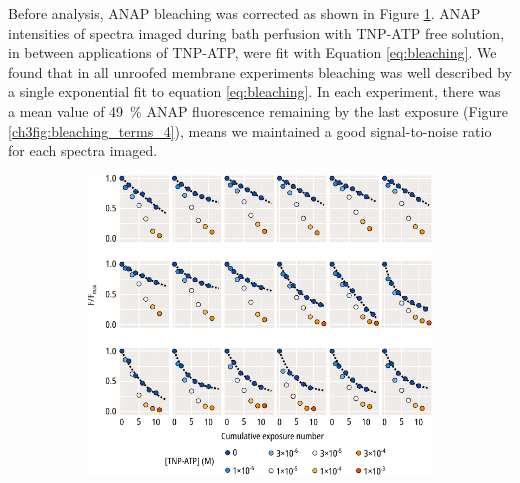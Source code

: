 Before analysis, ANAP bleaching was corrected as shown in Figure \ref{ch3fig:bleaching_plots_2}.
ANAP intensities of spectra imaged during bath perfusion with TNP-ATP free solution, in between applications of TNP-ATP, were fit with Equation \ref{eq:bleaching}.
We found that in all unroofed membrane experiments bleaching was well described by a single exponential fit to equation \ref{eq:bleaching}.
In each experiment, there was a mean value of \SI{49}{\percent} ANAP fluorescence remaining by the last exposure (Figure \ref{ch3fig:bleaching_terms_4}), means we maintained a good signal-to-noise ratio for each spectra imaged.

\begin{figure}[hbtp]
	\centering
	\begin{subfigure}[t]{0.9\textwidth}
		\caption{}\label{ch3fig:bleaching_plots_2}
		\centering
		\includegraphics[width=\textwidth]{bleaching_plots_2.pdf}
	\end{subfigure}
	\vfill
	\begin{subfigure}[t]{0.45\textwidth}
		\caption{}\label{ch3fig:bleaching_terms_3}
		\centering

\end{subfigure}
\end{figure}
